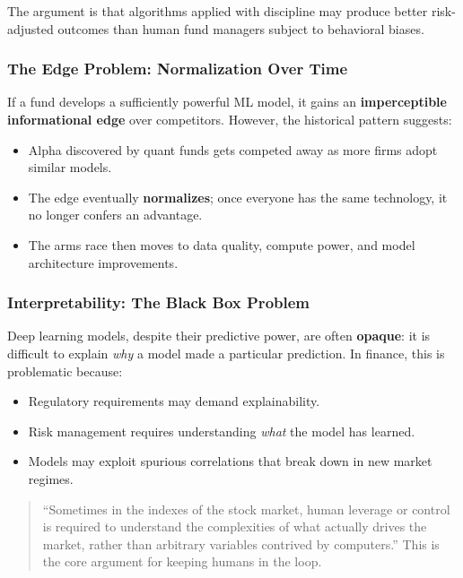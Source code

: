 \documentclass[12pt,openany]{book}
\begin{document}
The argument is that algorithms applied with discipline may produce better risk-adjusted outcomes than human fund managers subject to behavioral biases.

\subsubsection{The Edge Problem: Normalization Over Time}

If a fund develops a sufficiently powerful ML model, it gains an \textbf{imperceptible informational edge} over competitors. However, the historical pattern suggests:
\begin{itemize}[leftmargin=*]
    \item Alpha discovered by quant funds gets competed away as more firms adopt similar models.
    \item The edge eventually \textbf{normalizes}; once everyone has the same technology, it no longer confers an advantage.
    \item The arms race then moves to data quality, compute power, and model architecture improvements.
\end{itemize}

\subsubsection{Interpretability: The Black Box Problem}

Deep learning models, despite their predictive power, are often \textbf{opaque}: it is difficult to explain \textit{why} a model made a particular prediction. In finance, this is problematic because:
\begin{itemize}[leftmargin=*]
    \item Regulatory requirements may demand explainability.
    \item Risk management requires understanding \textit{what} the model has learned.
    \item Models may exploit spurious correlations that break down in new market regimes.
\end{itemize}

\begin{quote}
``Sometimes in the indexes of the stock market, human leverage or control is required to understand the complexities of what actually drives the market, rather than arbitrary variables contrived by computers.'' This is the core argument for keeping humans in the loop.
\end{quote}
\end{document}

